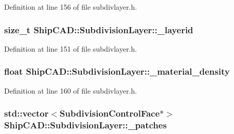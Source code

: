 Definition at line 156 of file subdivlayer.\-h.

\hypertarget{classShipCAD_1_1SubdivisionLayer_a73e4956d179d6ebd6c062e7e76bca196}{
\subsubsection[{\-\_\-layerid}]{\setlength{\rightskip}{0pt plus 5cm}size\-\_\-t Ship\-C\-A\-D\-::\-Subdivision\-Layer\-::\-\_\-layerid\hspace{0.3cm}{\ttfamily [protected]}}}\label{classShipCAD_1_1SubdivisionLayer_a73e4956d179d6ebd6c062e7e76bca196}


Definition at line 151 of file subdivlayer.\-h.

\hypertarget{classShipCAD_1_1SubdivisionLayer_adfdd4e996a5be7147a2eeb682dd93ff8}{
\subsubsection[{\-\_\-material\-\_\-density}]{\setlength{\rightskip}{0pt plus 5cm}float Ship\-C\-A\-D\-::\-Subdivision\-Layer\-::\-\_\-material\-\_\-density\hspace{0.3cm}{\ttfamily [protected]}}}\label{classShipCAD_1_1SubdivisionLayer_adfdd4e996a5be7147a2eeb682dd93ff8}


Definition at line 160 of file subdivlayer.\-h.

\hypertarget{classShipCAD_1_1SubdivisionLayer_a98b25b86a7104e4f987d34506438113f}{
\subsubsection[{\-\_\-patches}]{\setlength{\rightskip}{0pt plus 5cm}std\-::vector$<${\bf Subdivision\-Control\-Face}$\ast$$>$ Ship\-C\-A\-D\-::\-Subdivision\-Layer\-::\-\_\-patches\hspace{0.3cm}{\ttfamily [protected]}}}\label{classShipCAD_1_1SubdivisionLayer_a98b25b86a7104e4f987d34506438113f}


